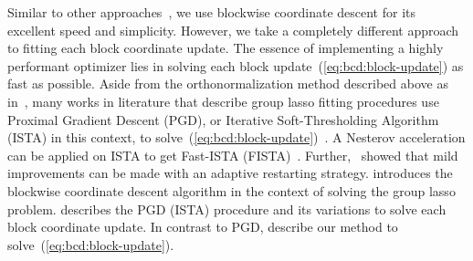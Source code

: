 Similar to other approaches~\citep{yuan:2006,meier:2008,tseng:2001,sparsegl:2022},
we use blockwise coordinate descent for its excellent speed and simplicity.
However, we take a completely different approach to fitting each block coordinate update.
The essence of implementing a highly performant optimizer lies in 
solving each block update~(\ref{eq:bcd:block-update}) as fast as possible.
Aside from the orthonormalization method described above as in~\citet{yuan:2006,meier:2008},
many works in literature that describe group lasso fitting procedures
use Proximal Gradient Descent (PGD), 
or Iterative Soft-Thresholding Algorithm (ISTA) in this context,
to solve~(\ref{eq:bcd:block-update})~\citep{sparsegl:2022,beck:2009,klosa:2020,wright:2009,loris:2009,sls:2016,odonoghue:2015}.
A Nesterov acceleration can be applied on ISTA to get Fast-ISTA (FISTA)~\citep{beck:2009}.
Further,~\citet{odonoghue:2015} showed that mild improvements can be made with an adaptive restarting strategy.
 introduces the blockwise coordinate descent algorithm in the context of
solving the group lasso problem.
 describes the PGD (ISTA) procedure and its variations to solve each block coordinate update.
In contrast to PGD,
 describe our method to solve~(\ref{eq:bcd:block-update}).




